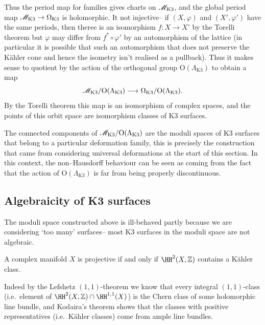 Thus the period map for families gives charts on \(\mathscr{M}_\text{K3}\), and the
global period map \(\mathscr{M}_\text{K3}\to \Omega_\text{K3}\) is holomorphic. It
not injective-- if \((X,\varphi)\) and \((X',\varphi')\)  have the same periods,
then theree is an isomorphism \(f:X\to X'\) by the Torelli theorem but
\(\varphi\) may differ from \(f^\ast \circ \varphi'\) by an automorphism of the
lattice (in particular it is possible that such an automorphism that does not
preserve the K\"ahler cone and hence the isometry isn't realised as a pullback).
Thus it makes sense to quotient by the action of the orthogonal group
\(\text{O}(\Lambda_\text{K3})\) to obtain a map
\[
    \mathscr{M}_\text{K3}/\text{O}(\Lambda_\text{K3})\longrightarrow
    \Omega_\text{K3}/\text{O}(\Lambda_\text{K3}).
\]
By the Torelli theorem this map is an isomorphism of complex spaces, and the
points of this orbit space are isomorphism classes of K3 surfaces.

The connected components of \(\mathscr{M}_\text{K3}/\text{O}(\Lambda_\text{K3})\)
are the moduli spaces of K3 surfaces that belong to a particular deformation
family, this is precisely the construction that came from considering universal
deformations at the start of this section. In this context, the non--Hausdorff
behaviour can be seen as coming from the fact that the action of
\(\text{O}(\Lambda_\text{K3})\) is far from being properly discontinuous.

\subsection{Algebraicity of K3 surfaces} The moduli space constructed above
is ill-behaved partly because we are considering `too many' surfaces-- most K3
surfaces in the moduli space are not algebraic.

\begin{theorem}[(Kodaira)]
    A complex manifold \(X\) is projective if and only if
    \(\HH^2(X,\mathbb{Z})\) contains a K\"ahler class.
\end{theorem}

Indeed by the Lefshetz \((1,1)\)-theorem we know that every integral
\((1,1)\)-class (i.e.\ element of \(\HH^2(X,\mathbb{Z})\cap \HH^{1,1}(X)\)) is
the Chern class of some holomorphic line bundle, and Kodaira's theorem shows
that the classes with positive representatives (i.e.\ K\"ahler classes) come
from ample line bundles.

